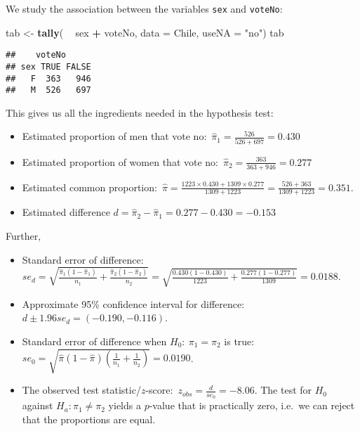 \documentclass[]{article}
\newenvironment{Shaded}{\begin{snugshade}}{\end{snugshade}}
\newcommand{\KeywordTok}[1]{\textcolor[rgb]{0.13,0.29,0.53}{\textbf{#1}}}
\newcommand{\DataTypeTok}[1]{\textcolor[rgb]{0.13,0.29,0.53}{#1}}
\newcommand{\StringTok}[1]{\textcolor[rgb]{0.31,0.60,0.02}{#1}}
\newcommand{\OperatorTok}[1]{\textcolor[rgb]{0.81,0.36,0.00}{\textbf{#1}}}
\newcommand{\NormalTok}[1]{#1}
\providecommand{\tightlist}{%
  \setlength{\itemsep}{0pt}\setlength{\parskip}{0pt}}
\begin{document}
We study the association between the variables \texttt{sex} and
\texttt{voteNo}:

\begin{Shaded}
\begin{Highlighting}[]
\NormalTok{tab <-}\StringTok{ }\KeywordTok{tally}\NormalTok{( }\OperatorTok{~}\StringTok{ }\NormalTok{sex }\OperatorTok{+}\StringTok{ }\NormalTok{voteNo, }\DataTypeTok{data =}\NormalTok{ Chile, }\DataTypeTok{useNA =} \StringTok{"no"}\NormalTok{)}
\NormalTok{tab}
\end{Highlighting}
\end{Shaded}

\begin{verbatim}
##    voteNo
## sex TRUE FALSE
##   F  363   946
##   M  526   697
\end{verbatim}

This gives us all the ingredients needed in the hypothesis test:

\begin{itemize}
\tightlist
\item
  Estimated proportion of men that vote
  no:~\(\hat{\pi}_1=\frac{526}{526+697}=0.430\)
\item
  Estimated proportion of women that vote
  no:~\(\hat{\pi}_2=\frac{363}{363+946}=0.277\)
\item
  Estimated common
  proportion:~\(\hat{\pi}=\frac{1223 \times 0.430 + 1309 \times 0.277}{1309+1223}=\frac{526 + 363}{1309+1223}=0.351.\)
\item
  Estimated difference \(d=\hat{\pi}_2-\hat{\pi}_1=0.277-0.430=-0.153\)
\end{itemize}

Further,

\begin{itemize}
\tightlist
\item
  Standard error of difference:\\
  \(se_d=\sqrt{\frac{\hat{\pi}_1(1-\hat{\pi}_1)}{n_1}+\frac{\hat{\pi}_2(1-\hat{\pi}_2)}{n_2}}  = \sqrt{\frac{0.430(1-0.430)}{1223}+\frac{0.277(1-0.277)}{1309}}= 0.0188\).
\item
  Approximate 95\% confidence interval for
  difference:~\(d\pm  1.96se_d=(-0.190, -0.116)\).
\item
  Standard error of difference when \(H_0:\ \pi_1=\pi_2\) is true:\\
  \(se_0=\sqrt{\hat{\pi}(1-\hat{\pi})(\frac{1}{n_1}+\frac{1}{n_2})} = 0.0190\).
\item
  The observed test
  statistic/\(z\)-score:~\(z_{obs}=\frac{d}{se_0}=-8.06\). The test for
  \(H_0\) against \(H_a:  \pi_1\not=\pi_2\) yields a \(p\)-value that is
  practically zero, i.e.~we can reject that the proportions are equal.
\end{itemize}
\end{document}
